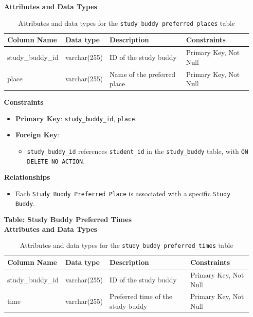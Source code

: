 \documentclass[12pt]{article}
\begin{document}
    \textbf{Attributes and Data Types}
    \begin{table}[H] 
        \centering 
        \renewcommand{\arraystretch}{1.5} 
        \begin{tabular}{|l|l|p{4.5cm}|l|} 
        \hline 
        \rowcolor[HTML]{96FFFB} 
        \textbf{Column Name} & \textbf{Data type} & \textbf{Description} & \textbf{Constraints} \\ \hline 
        study\_buddy\_id & varchar(255) & ID of the study buddy & Primary Key, Not Null \\ \hline 
        place & varchar(255) & Name of the preferred place & Primary Key, Not Null \\ \hline 
        \end{tabular} 
        \caption{Attributes and data types for the \texttt{study\_buddy\_preferred\_places} table} 
    \end{table}

    \noindent 
    \textbf{Constraints} 
    \begin{itemize} 
        \item \textbf{Primary Key}: \texttt{study\_buddy\_id}, \texttt{place}. 
        \item \textbf{Foreign Key}: \begin{itemize} \item \texttt{study\_buddy\_id} references \texttt{student\_id} in the \texttt{study\_buddy} table, with \texttt{ON DELETE NO ACTION}. 
        \end{itemize} 
    \end{itemize}

    \noindent 
    \textbf{Relationships} 
    \begin{itemize} 
        \item Each \texttt{Study Buddy Preferred Place} is associated with a specific \texttt{Study Buddy}.
    \end{itemize}

    \textbf{Table: Study Buddy Preferred Times} \\

    \textbf{Attributes and Data Types}
    \begin{table}[H] 
        \centering 
        \renewcommand{\arraystretch}{1.5} 
        \begin{tabular}{|l|l|p{4.5cm}|l|} 
        \hline 
        \rowcolor[HTML]{96FFFB} 
        \textbf{Column Name} & \textbf{Data type} & \textbf{Description} & \textbf{Constraints} \\ \hline 
        study\_buddy\_id & varchar(255) & ID of the study buddy & Primary Key, Not Null \\ \hline 
        time & varchar(255) & Preferred time of the study buddy & Primary Key, Not Null \\ \hline 
        \end{tabular} 
        \caption{Attributes and data types for the \texttt{study\_buddy\_preferred\_times} table} 
    \end{table}
\end{document}
